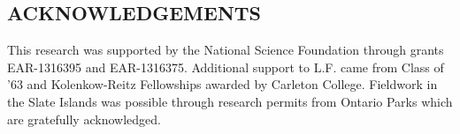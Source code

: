 \documentclass[11pt,letterpaper]{article}
\begin{document}
\subsection*{ACKNOWLEDGEMENTS}
\footnotesize

This research was supported by the National Science Foundation through grants EAR-1316395 and EAR-1316375. Additional support to L.F. came from Class of '63 and Kolenkow-Reitz Fellowships awarded by Carleton College. Fieldwork in the Slate Islands was possible through research permits from Ontario Parks which are gratefully acknowledged.

\singlespacing

\newpage



\end{document}
